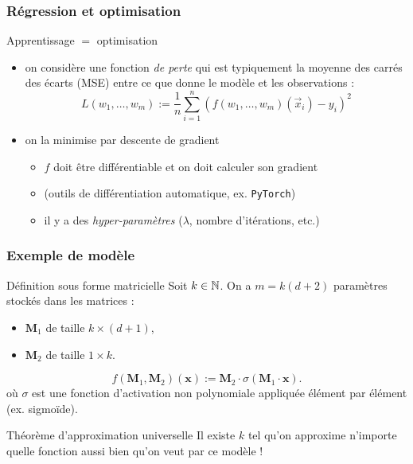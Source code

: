 \begin{frame}
  \frametitle{Régression et optimisation}

  \begin{block}{Apprentissage $=$ optimisation}

    \begin{itemize}
    \item on considère une fonction \emph{de perte} qui
      est typiquement la moyenne des carrés des écarts (MSE)
      entre ce que donne le modèle et les observations :
      \[ L(w_1, \dots, w_m) :=
      \frac{1}{n} \sum_{i=1}^n (f(w_1, \dots, w_m)(\vec{x}_i) - y_i)^2 \]
    \item on la minimise par descente de gradient
      \begin{itemize}
      \item $f$ doit être différentiable et on doit calculer son gradient
      \item (outils de différentiation automatique, ex. \verb!PyTorch!)
      \item il y a des \emph{hyper-paramètres} ($\lambda$, nombre d'itérations, etc.)
      \end{itemize}
    \end{itemize}

  \end{block}
  
\end{frame}

\newcommand\mat[1]{\mathbf{#1}}

\begin{frame}
  \frametitle{Exemple de modèle}
  
  \begin{block}{Définition sous forme matricielle}
    Soit $k \in {\ensuremath\mathbb{N}}$.
    On a $m = k(d+2)$ paramètres stockés dans les matrices :
    \begin{itemize}
      \item $\mat{M}_1$ de taille $k \times (d+1)$,
      \item $\mat{M}_2$ de taille $1 \times k$.
    \end{itemize}
    
    \[ f(\mat{M}_1, \mat{M}_2)(\mat{x}) := \mat{M}_2 \cdot \sigma ( \mat{M}_1 \cdot \mat{x} ). \]
    où $\sigma$ est une fonction d'activation non polynomiale appliquée
    élément par élément (ex. sigmoïde). 
  \end{block}
  
  \begin{block}{Théorème d'approximation universelle}
  Il existe $k$ tel qu'on approxime n'importe quelle fonction
  aussi bien qu'on veut par ce modèle ! 
  \end{block}

\end{frame}

